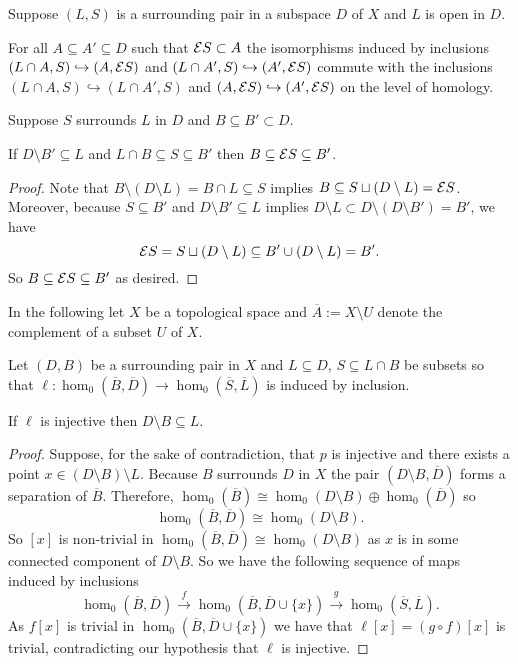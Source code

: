 \begin{lemma}\label{lem:excision_commute}
  Suppose $(L, S)$ is a surrounding pair in a subspace $D$ of $X$ and $L$ is open in $D$.

  For all $A\subseteq A'\subseteq D$ such that $\mathcal{E} S\subset A$ the isomorphisms induced by inclusions $(L\cap A, S)\hookrightarrow (A, \mathcal{E} S)$ and $(L\cap A', S)\hookrightarrow (A', \mathcal{E} S)$ commute with the inclusions $(L\cap A, S)\hookrightarrow (L\cap A', S)$ and $(A, \mathcal{E} S)\hookrightarrow (A', \mathcal{E} S)$ on the level of homology.
\end{lemma}

\begin{lemma}\label{lem:surround_and_cover}
  Suppose $S$ surrounds $L$ in $D$ and $B\subseteq B'\subset D$.

  If $D\setminus B'\subseteq L$ and $L\cap B\subseteq S\subseteq B'$ then $B\subseteq \mathcal{E} S\subseteq B'$.
\end{lemma}
\begin{proof}
  Note that $B\setminus (D\setminus L) = B\cap L\subseteq S$ implies $B\subseteq S\sqcup(D\setminus L) = \mathcal{E} S$.
  Moreover, because $S\subseteq B'$ and $D\setminus B'\subseteq L$ implies $D\setminus L \subset D\setminus (D\setminus B') = B'$, we have
  \[ \mathcal{E} S = S\sqcup (D\setminus L) \subseteq B'\cup (D\setminus L) = B'. \]
  So $B \subseteq \mathcal{E} S\subseteq B'$ as desired.
\end{proof}

In the following let $X$ be a topological space and $\overline{A} := X\setminus U$ denote the complement of a subset $U$ of $X$.

\begin{lemma}\label{lem:coverage}
  Let $(D, B)$ be a surrounding pair in $X$ and $L\subseteq D$, $S\subseteq L\cap B$ be subsets so that $\ell: \hom_0(\overline{B}, \overline{D})\to \hom_0(\overline{S}, \overline{L})$ is induced by inclusion.

  If $\ell$ is injective then $D\setminus B\subseteq L$.
\end{lemma}
\begin{proof}
    Suppose, for the sake of contradiction, that $p$ is injective and there exists a point $x\in (D\setminus B)\setminus L$.
    Because $B$ surrounds $D$ in $X$ the pair $(D\setminus B, \overline{D})$ forms a separation of $\overline{B}$.
    Therefore, $\hom_0(\overline{B})\cong \hom_0(D\setminus B)\oplus \hom_0(\overline{D})$ so
    \[ \hom_0(\overline{B}, \overline{D})\cong \hom_0(D\setminus B). \]
    So $[x]$ is non-trivial in $\hom_0(\overline{B},\overline{D})\cong \hom_0(D\setminus B)$ as $x$ is in some connected component of $D\setminus B$.
    So we have the following sequence of maps induced by inclusions
    \[ \hom_0(\overline{B},\overline{D})\xrightarrow{f} \hom_0(\overline{B},\overline{D}\cup\{x\})\xrightarrow{g} \hom_0(\overline{S},\overline{L}).\]
    As $f[x]$ is trivial in $\hom_0(\overline{B},\overline{D}\cup\{x\})$ we have that $\ell[x] = (g\circ f)[x]$ is trivial, contradicting our hypothesis that $\ell$ is injective.
\end{proof}

